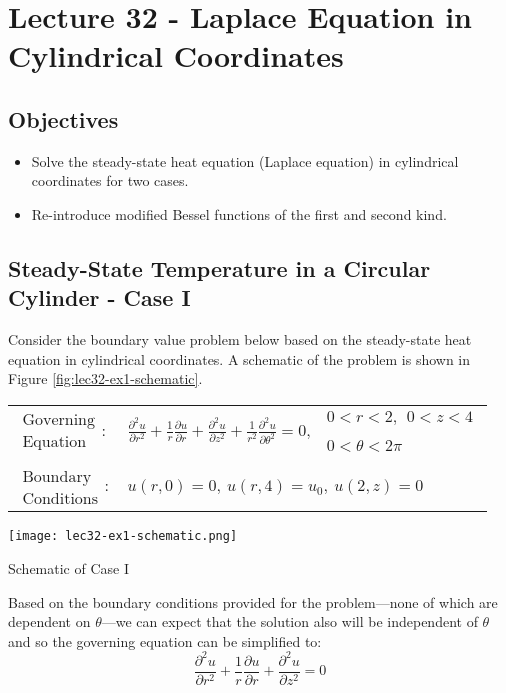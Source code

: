\chapter{Lecture 32 - Laplace Equation in Cylindrical Coordinates}
\label{ch:lec32}
\section{Objectives}
\begin{itemize}
\item Solve the steady-state heat equation (Laplace equation) in cylindrical coordinates for two cases.
\item Re-introduce modified Bessel functions of the first and second kind.
\end{itemize}
\setcounter{lstannotation}{0}

\section{Steady-State Temperature in a Circular Cylinder - Case I}
Consider the boundary value problem below based on the steady-state heat equation in cylindrical coordinates. A schematic of the problem is shown in Figure \ref{fig:lec32-ex1-schematic}.
\begin{table}[h]
\begin{tabular}{l l}
$\substack{\text{Governing} \\\text{Equation}}: $& $\frac{\partial^2 u}{\partial r^2} + \frac{1}{r}\frac{\partial u}{\partial r} + \frac{\partial^2 u}{\partial z^2} + \frac{1}{r^2}\frac{\partial^2 u}{\partial \theta^2}= 0, \ \ \substack{0<r<2, \ \ 0<z<4 \\ \\ 0<\theta<2 \pi}$\\
& \\
$\substack{\text{Boundary} \\ \text{Conditions}}: $ & $u(r,0) = 0, \ u(r,4) = u_0, \ u(2,z) = 0$  \\ 
\end{tabular}
\end{table} 
\begin{marginfigure}
\texttt{[image: lec32-ex1-schematic.png]}
\caption{Schematic of Case I}
\label{fig:lec32-ex1-schematic}
\end{marginfigure}

\vspace{0.25cm}

\noindent Based on the boundary conditions provided for the problem---none of which are dependent on $\theta$---we can expect that the solution also will be independent of $\theta$ and so the governing equation can be simplified to:
\begin{equation*}
\frac{\partial^2 u}{\partial r^2} + \frac{1}{r}\frac{\partial u}{\partial r} + \frac{\partial^2 u}{\partial z^2} = 0
\end{equation*}

